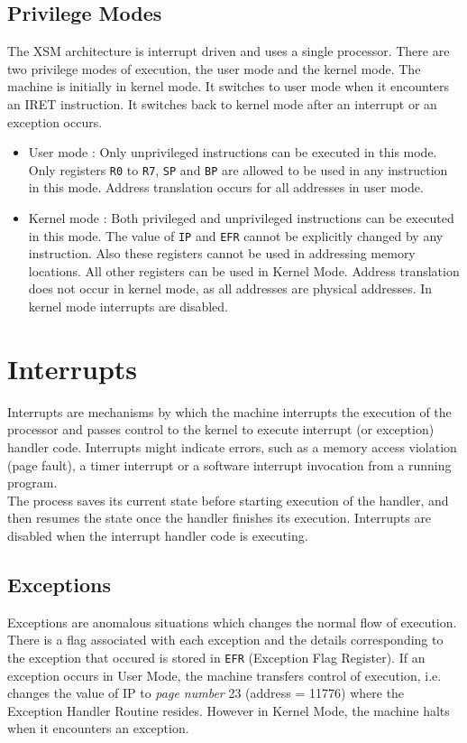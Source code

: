 \documentclass[11pt]{report}
\begin{document}
\section{Privilege Modes}
\label{sec:priv_modes}
The XSM architecture is interrupt driven and uses a single processor. There are two privilege modes of execution, the user mode and the kernel mode. The machine is initially in kernel mode. It switches to user mode when it encounters an IRET instruction. It switches back to kernel mode after an interrupt or an exception occurs.



\begin{itemize}
\item User mode : Only unprivileged instructions can be executed in this mode. Only registers \texttt{R0} to \texttt{R7}, \texttt{SP} and \texttt{BP} are allowed to be used in any instruction in this mode. Address translation occurs for all addresses in user mode.

\item Kernel mode : Both privileged and unprivileged instructions can be executed in this mode. The value of \texttt{IP} and \texttt{EFR} cannot be explicitly changed by any instruction. Also these registers cannot be used in addressing memory locations. All other registers can be used in Kernel Mode. Address translation does not occur in kernel mode, as all addresses are physical addresses. In kernel mode interrupts are disabled. 


\end{itemize}

\chapter{Interrupts}
\label{sec:int}
Interrupts are mechanisms by which the machine interrupts the execution of the processor and passes control to the kernel to execute interrupt (or exception) handler code. Interrupts might indicate errors, such as a memory access violation (page fault), a timer interrupt or a software interrupt invocation from a running program. \\

The process saves its current state before starting execution of the handler, and then resumes the state once the handler finishes its execution. Interrupts are disabled when the interrupt handler code is executing.



\section{Exceptions}
\label{excpetion}
Exceptions are anomalous situations which changes the normal flow of execution. There is a flag associated with each exception and the details corresponding to the exception that occured is stored in \texttt{EFR} (Exception Flag Register). If an exception occurs in User Mode, the machine transfers control of execution, i.e. changes the value of IP to \textit{page number} 23 (address = 11776) where the Exception Handler Routine resides. However in Kernel Mode, the machine halts when it encounters an exception.\\
\end{document}
